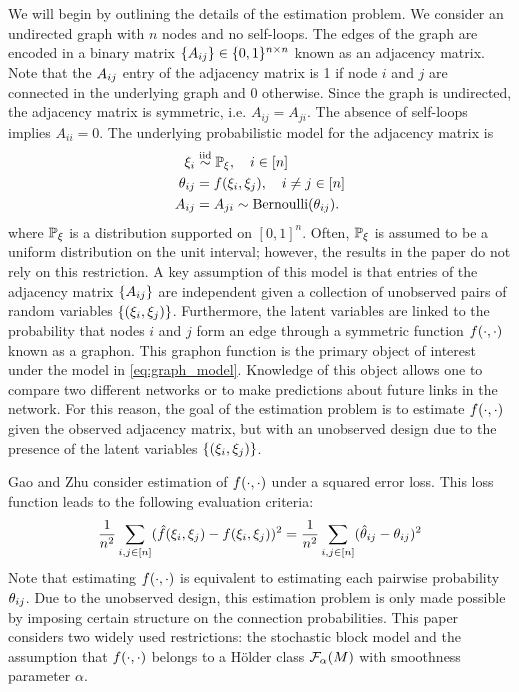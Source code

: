 \documentclass[11pt]{article}
\begin{document}
We will begin by outlining the details of the estimation problem. We consider an undirected graph with $n$ nodes and no self-loops. The edges of the graph are encoded in a binary matrix $\{A_{ij}\} \in \{0, 1\}^{n \times n}$ known as an adjacency matrix. Note that the $A_{ij}$ entry of the adjacency matrix is 1 if node $i$ and $j$ are connected in the underlying graph and 0 otherwise. Since the graph is undirected, the adjacency matrix is symmetric, i.e. $A_{ij} = A_{ji}$. The absence of self-loops implies $A_{ii} = 0$. The underlying probabilistic model for the adjacency matrix is
\begin{equation}\label{eq:graph_model}
\begin{aligned}
\xi_i &\overset{\text{iid}}{\sim} \mathbb{P}_{\xi}, \quad i \in \lbrack n\rbrack \\
\theta_{ij} &= f(\xi_{i}, \xi_{j}), \quad i \neq j \in \lbrack n\rbrack \\
A_{ij} &= A_{ji} \sim \operatorname{Bernoulli}(\theta_{ij}).
\end{aligned}
\end{equation}
where $\mathbb{P}_{\xi}$ is a distribution supported on $[0, 1]^n$. Often, $\mathbb{P}_{\xi}$ is assumed to be a uniform distribution on the unit interval; however, the results in the paper do not rely on this restriction. A key assumption of this model is that entries of the adjacency matrix $\{A_{ij}\}$ are independent given a collection of unobserved pairs of random variables $\{(\xi_i, \xi_j)\}$. Furthermore, the latent variables are linked to the probability that nodes $i$ and $j$ form an edge through a symmetric function $f(\cdot, \cdot)$ known as a graphon. This graphon function is the primary object of interest under the model in \ref{eq:graph_model}. Knowledge of this object allows one to compare two different networks or to make predictions about future links in the network.
For this reason, the goal of the estimation problem is to estimate $f(\cdot, \cdot)$ given the observed adjacency matrix, but with an unobserved design due to the presence of the latent variables $\{(\xi_i, \xi_j)\}$.

Gao and Zhu consider estimation of $f(\cdot, \cdot)$ under a squared error loss. This loss function leads to the following evaluation criteria:
\begin{equation}\label{eq:loss_func}
\frac{1}{n^2}\sum_{i, j \in \lbrack n\rbrack}(\hat{f}(\xi_i, \xi_j) - f(\xi_i, \xi_j))^2 =
\frac{1}{n^2}\sum_{i, j \in \lbrack n\rbrack}(\hat{\theta}_{ij} - \theta_{ij})^2
\end{equation}
Note that estimating $f(\cdot, \cdot)$ is equivalent to estimating each pairwise probability $\theta_{ij}$. Due to the unobserved design, this estimation problem is only made possible by imposing certain structure on the connection probabilities. This paper considers two widely used restrictions: the stochastic block model and the assumption that $f(\cdot, \cdot)$ belongs to a H\"older class $\mathcal{F}_{\alpha}(M)$ with smoothness parameter $\alpha$.
\end{document}
